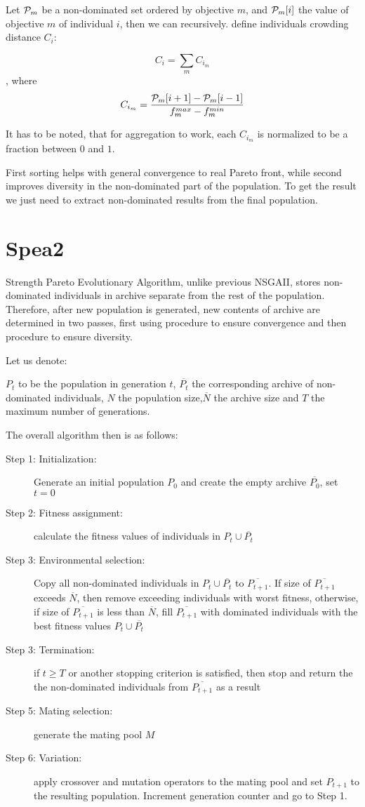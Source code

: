 \documentclass[12pt,oneside]{fithesis2}
\begin{document}
Let ${\cal P}_m$ be a non-dominated set ordered by objective $m$, and ${\cal P}_m[i]$ the value of objective $m$ of individual $i$, then we can recursively. define individuals crowding distance $C_i$:

$$C_i = \sum\limits_{m} C_{i_m} $$, where $$C_{i_m} = \frac{{\cal P}_m[i+1] - {\cal P}_m[i-1]}{f^{max}_m - f^{min}_m}$$

It has to be noted, that for aggregation to work, each $C_{i_m}$ is normalized to be a fraction between $0$ and $1$. 

First sorting helps with general convergence to real Pareto front, while second improves diversity in the non-dominated part of the population. To get the result we just need to extract non-dominated results from the final population. 

\section{Spea2}
Strength Pareto Evolutionary Algorithm\cite{zitzler2001spea2}, unlike previous NSGAII, stores non-dominated individuals in archive separate from the rest of the population. Therefore, after new population is generated, new contents of archive are determined in two passes, first using procedure to ensure convergence and then procedure to ensure diversity.

Let us denote:

$P_t$ to be the population in generation $t$, $\overline{P_t}$ the corresponding archive of non-dominated individuals, $N$ the population size,$\overline N$ the archive size and $T$ the maximum number of generations.

The overall algorithm then is as follows:

\begin{description}
	\item[Step 1: Initialization:] Generate an initial population $P_0$ and create the empty archive $\overline{P_0}$, set $t=0$
	\item[Step 2: Fitness assignment:] calculate the fitness values of individuals in $P_t \cup \overline{P_t}$
	\item[Step 3: Environmental selection:] Copy all non-dominated individuals in $P_t \cup \overline{P_t}$ to $\overline{P_{t+1}}$. If size of $\overline{P_{t+1}}$ exceeds $\overline N$, then remove exceeding individuals with worst fitness, otherwise, if size of $\overline{P_{t+1}}$ is less than $\overline N$, fill $\overline{P_{t+1}}$ with dominated individuals with the best fitness values $P_t \cup \overline{P_t}$
	\item[Step 3: Termination:] if $t \geq T$ or another stopping criterion is satisfied, then stop and return the the non-dominated individuals from $\overline{P_{t+1}}$ as a result
	\item[Step 5: Mating selection:] generate the mating pool $M$
	\item[Step 6: Variation:] apply crossover and mutation operators to the mating pool and set $P_{t+1}$ to the resulting population. Increment generation counter and go to Step 1.
\end{description}
\end{document}
